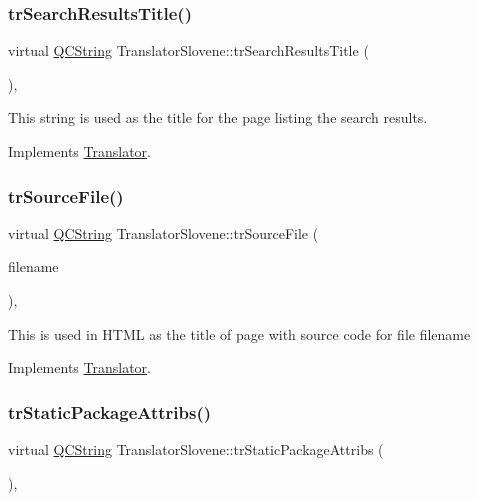 \subsubsection{\texorpdfstring{trSearchResultsTitle()}{trSearchResultsTitle()}}
{\footnotesize\ttfamily virtual \mbox{\hyperlink{class_q_c_string}{Q\+C\+String}} Translator\+Slovene\+::tr\+Search\+Results\+Title (\begin{DoxyParamCaption}{ }\end{DoxyParamCaption})\hspace{0.3cm}{\ttfamily [inline]}, {\ttfamily [virtual]}}

This string is used as the title for the page listing the search results. 

Implements \mbox{\hyperlink{class_translator}{Translator}}.

\mbox{\label{class_translator_slovene_a5bb51484f92d4ebdfe1d1f5a60ad3337}} 
\subsubsection{\texorpdfstring{trSourceFile()}{trSourceFile()}}
{\footnotesize\ttfamily virtual \mbox{\hyperlink{class_q_c_string}{Q\+C\+String}} Translator\+Slovene\+::tr\+Source\+File (\begin{DoxyParamCaption}\item[{\mbox{\hyperlink{class_q_c_string}{Q\+C\+String}} \&}]{filename }\end{DoxyParamCaption})\hspace{0.3cm}{\ttfamily [inline]}, {\ttfamily [virtual]}}

This is used in H\+T\+ML as the title of page with source code for file filename 

Implements \mbox{\hyperlink{class_translator}{Translator}}.

\mbox{\label{class_translator_slovene_ab17a1659a2abd967872fa7a78aaf1dbf}} 
\subsubsection{\texorpdfstring{trStaticPackageAttribs()}{trStaticPackageAttribs()}}
{\footnotesize\ttfamily virtual \mbox{\hyperlink{class_q_c_string}{Q\+C\+String}} Translator\+Slovene\+::tr\+Static\+Package\+Attribs (\begin{DoxyParamCaption}{ }\end{DoxyParamCaption})\hspace{0.3cm}{\ttfamily [inline]}, {\ttfamily [virtual]}}

